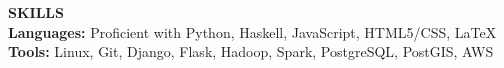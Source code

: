 \textbf{SKILLS} \\
\textbf{Languages:} Proficient with Python, Haskell, JavaScript, HTML5/CSS, \LaTeX\\
\textbf{Tools:} Linux, Git, Django, Flask, Hadoop, Spark, PostgreSQL, PostGIS, AWS \\
\thispagestyle{empty}

